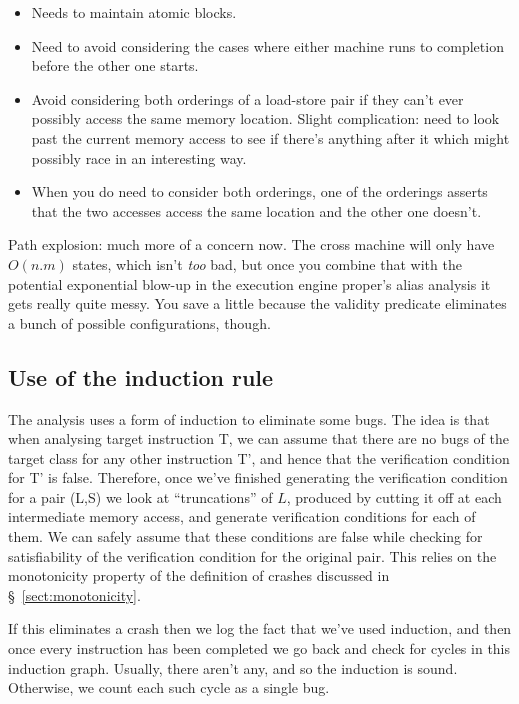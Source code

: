 \begin{itemize}
\item
  Needs to maintain atomic blocks.
\item
  Need to avoid considering the cases where either machine runs to completion before the other one starts.
\item
  Avoid considering both orderings of a load-store pair if they can't ever possibly access the same memory location.
  Slight complication: need to look past the current memory access to see if there's anything after it which might possibly race in an interesting way.
\item
  When you do need to consider both orderings, one of the orderings asserts that the two accesses access the same location and the other one doesn't.
\end{itemize}

Path explosion: much more of a concern now.
The cross machine will only have $O(n.m)$ states, which isn't \emph{too} bad, but once you combine that with the potential exponential blow-up in the execution engine proper's alias analysis it gets really quite messy.
You save a little because the validity predicate eliminates a bunch of possible configurations, though.

\subsection{Use of the induction rule}

The analysis uses a form of induction to eliminate some bugs.
The idea is that when analysing target instruction T, we can assume that there are no bugs of the target class for any other instruction T', and hence that the verification condition for T' is false.
Therefore, once we've finished generating the verification condition for a \StateMachine pair (L,S) we look at ``truncations'' of $L$, produced by cutting it off at each intermediate memory access, and generate verification conditions for each of them.
We can safely assume that these conditions are false while checking for satisfiability of the verification condition for the original \StateMachine pair.
This relies on the monotonicity property of the definition of crashes discussed in \S~\ref{sect:monotonicity}.

If this eliminates a crash then we log the fact that we've used induction, and then once every instruction has been completed we go back and check for cycles in this induction graph.
Usually, there aren't any, and so the induction is sound.
Otherwise, we count each such cycle as a single bug.

